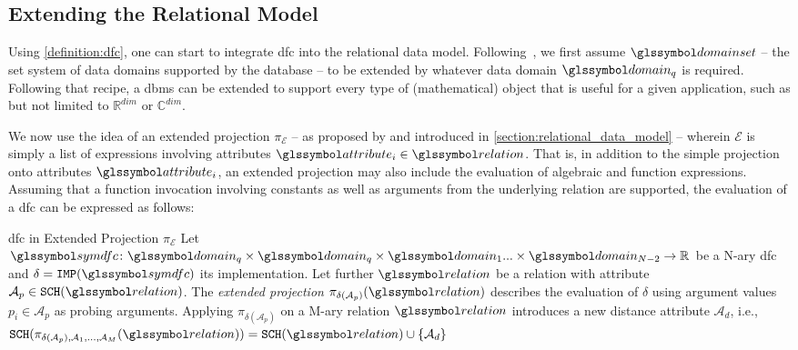 \subsection{Extending the Relational Model}

Using \cref{definition:dfc}, one can start to integrate \acrshort{dfc} into the relational data model. Following~\cite{Giangreco:2018thesis}, we first assume  $\domainset$ -- the set system of data domains supported by the database -- to be extended by whatever data domain $\domain_q$ is required. Following that recipe, a \acrshort{dbms} can be extended to support every type of (mathematical) object that is useful for a given application, such as but not limited to $\mathbb{R}^{dim}$ or $\mathbb{C}^{dim}$. 

We now use the idea of an extended projection $\pi_{\mathcal{E}}$ -- as proposed by \cite{Gupta:1995Generalized,Garcia:2009Database} and introduced in \cref{section:relational_data_model} -- wherein $\mathcal{E}$ is simply a list of expressions involving attributes $\attribute_i \in \relation$. That is, in addition to the simple projection onto attributes $\attribute_i$, an extended projection may also include the evaluation of algebraic and function expressions. Assuming that a function invocation involving constants as well as arguments from the underlying relation are supported, the evaluation of a \acrshort{dfc} can be expressed as follows:

\begin{definition}[label=definition:spf_rel]{\acrlong{dfc} in Extended Projection $\pi_{\mathcal{E}}$}{}
    Let $\symdfc \colon \domain_q \times \domain_q \times \domain_{1} ... \times \domain_{N-2} \to \mathbb{R}$ be a N-ary \acrshort{dfc} and $\delta = \mathtt{IMP}(\symdfc)$ its implementation. Let further $\relation$ be a relation with attribute $\mathcal{A}_p \in \mathtt{SCH}(\relation)$. The \emph{extended projection} $\pi_{\delta(\mathcal{A}_p)}(\relation)$ describes the evaluation of $\delta$ using argument values $p_{i} \in \mathcal{A}_p$ as probing arguments. Applying $\pi_{\delta(\mathcal{A}_p)}$ on a M-ary relation $\relation$ introduces a new distance attribute $\mathcal{A}_d$, i.e., $\mathtt{SCH}(\pi_{\delta(\mathcal{A}_p), \mathcal{A}_1, ..., \mathcal{A}_M}(\relation)) = \mathtt{SCH}(\relation) \cup \{ \mathcal{A}_d \}$
\end{definition}

